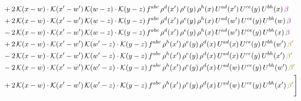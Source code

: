 \documentclass[9pt]{article}
\numberwithin{equation}{section}
\begin{document}
\begin{align}
&+2\,\mathcal{K}(x-w)\cdot\mathcal{K}(x'-w')\,\mathcal{K}(w-z)\cdot\mathcal{K}(y-z)\, f^{abc}\,\rho^{d}(x')\,\rho^{e}(y)\,\rho^{h}(x)\,U^{ad}(x')\,U^{ce}(y)\,U^{bh}(x)\,{\color{violet} \beta}\notag \\ & +2\,\mathcal{K}(x-w)\cdot\mathcal{K}(x'-w')\,\mathcal{K}(w-z)\cdot\mathcal{K}(y-z)\, f^{abc}\,\rho^{d}(x')\,\rho^{e}(y)\,\rho^{h}(x)\,U^{ad}(w')\,U^{ce}(y)\,U^{bh}(w)\,{\color{violet} \beta} \notag\\ & -2\,\mathcal{K}(x-w)\cdot\mathcal{K}(x'-w')\,\mathcal{K}(w-z)\cdot\mathcal{K}(y-z)\, f^{abc}\,\rho^{d}(x')\,\rho^{e}(y)\,\rho^{h}(x)\,U^{ad}(w')\,U^{ce}(y)\,U^{bh}(x)\,{\color{violet} \beta}\notag\\ & +2\,\mathcal{K}(x-w)\cdot\mathcal{K}(x'-w')\,\mathcal{K}(w'-z)\cdot\mathcal{K}(y-z)\, f^{abc}\,\rho^{h}(x')\,\rho^{e}(y)\,\rho^{d}(x)\,U^{ad}(x)\,U^{ce}(y)\,U^{bh}(w')\,{\color{olive}\beta'}\notag \\ & -2\,\mathcal{K}(x-w)\cdot\mathcal{K}(x'-w')\,\mathcal{K}(w'-z)\cdot\mathcal{K}(y-z)\, f^{abc}\,\rho^{h}(x')\,\rho^{e}(y)\,\rho^{d}(x)\,U^{ad}(x)\,U^{ce}(y)\,U^{bh}(x')\,{\color{olive}\beta'} \notag\\ & -2\,\mathcal{K}(x-w)\cdot\mathcal{K}(x'-w')\,\mathcal{K}(w'-z)\cdot\mathcal{K}(y-z)\, f^{abc}\,\rho^{h}(x')\,\rho^{e}(y)\,\rho^{d}(x)\,U^{ad}(w)\,U^{ce}(y)\,U^{bh}(w')\,{\color{olive}\beta'} \notag\\ & +2\,\mathcal{K}(x-w)\cdot\mathcal{K}(x'-w')\,\mathcal{K}(w'-z)\cdot\mathcal{K}(y-z)\, f^{abc}\,\rho^{h}(x')\,\rho^{e}(y)\,\rho^{d}(x)\,U^{ad}(w)\,U^{ce}(y)\,U^{bh}(x')\,{\color{olive}\beta'}\Bigg]
\end{align}
\end{document}
